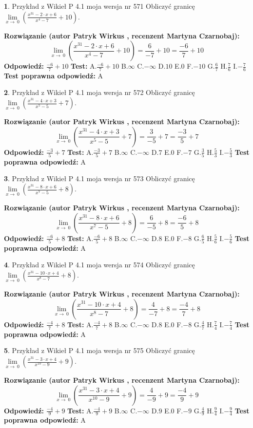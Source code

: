 \documentclass[12pt, a4paper]{article}
\theoremstyle{definition} %
\newtheorem{zad}{}
\newcommand{\zadStart}[1]{\begin{zad}#1\newline}
\newcommand{\zadStop}{\end{zad}}
\newcommand{\rozwStart}[2]{\noindent \textbf{Rozwiązanie (autor #1 , recenzent #2): }\newline}
\newcommand{\rozwStop}{\newline}
\newcommand{\odpStart}{\noindent \textbf{Odpowiedź:}\newline}
\newcommand{\odpStop}{\newline}
\newcommand{\testStart}{\noindent \textbf{Test:}\newline}
\newcommand{\testStop}{\newline}
\newcommand{\kluczStart}{\noindent \textbf{Test poprawna odpowiedź:}\newline}
\newcommand{\kluczStop}{\newline}
\begin{document}
\zadStart{Przykład z Wikieł P 4.1 moja wersja nr 571}
Obliczyć granicę $\lim\limits_{x\to\ 0}(\frac{x^{31}-2 \cdot x +6}{x^{4}-7}+10)$.
\zadStop
\rozwStart{Patryk Wirkus}{Martyna Czarnobaj}
$$\lim\limits_{x\to\ 0}(\frac{x^{31}-2 \cdot x +6}{x^{4}-7}+10)=\frac{6}{-7}+10=\frac{-6}{7}+10$$
\rozwStop
\odpStart
$\frac{-6}{7}+10$
\odpStop
\testStart
A.$\frac{-6}{7}+10$
B.$\infty$
C.$-\infty$
D.$10$
E.$0$
F.$-10$
G.$\frac{6}{7}$
H.$\frac{7}{6}$
I.$-\frac{7}{6}$
\testStop
\kluczStart
A
\kluczStop



\zadStart{Przykład z Wikieł P 4.1 moja wersja nr 572}
Obliczyć granicę $\lim\limits_{x\to\ 0}(\frac{x^{31}-4 \cdot x +3}{x^{5}-5}+7)$.
\zadStop
\rozwStart{Patryk Wirkus}{Martyna Czarnobaj}
$$\lim\limits_{x\to\ 0}(\frac{x^{31}-4 \cdot x +3}{x^{5}-5}+7)=\frac{3}{-5}+7=\frac{-3}{5}+7$$
\rozwStop
\odpStart
$\frac{-3}{5}+7$
\odpStop
\testStart
A.$\frac{-3}{5}+7$
B.$\infty$
C.$-\infty$
D.$7$
E.$0$
F.$-7$
G.$\frac{3}{5}$
H.$\frac{5}{3}$
I.$-\frac{5}{3}$
\testStop
\kluczStart
A
\kluczStop



\zadStart{Przykład z Wikieł P 4.1 moja wersja nr 573}
Obliczyć granicę $\lim\limits_{x\to\ 0}(\frac{x^{31}-8 \cdot x +6}{x^{7}-5}+8)$.
\zadStop
\rozwStart{Patryk Wirkus}{Martyna Czarnobaj}
$$\lim\limits_{x\to\ 0}(\frac{x^{31}-8 \cdot x +6}{x^{7}-5}+8)=\frac{6}{-5}+8=\frac{-6}{5}+8$$
\rozwStop
\odpStart
$\frac{-6}{5}+8$
\odpStop
\testStart
A.$\frac{-6}{5}+8$
B.$\infty$
C.$-\infty$
D.$8$
E.$0$
F.$-8$
G.$\frac{6}{5}$
H.$\frac{5}{6}$
I.$-\frac{5}{6}$
\testStop
\kluczStart
A
\kluczStop



\zadStart{Przykład z Wikieł P 4.1 moja wersja nr 574}
Obliczyć granicę $\lim\limits_{x\to\ 0}(\frac{x^{31}-10 \cdot x +4}{x^{8}-7}+8)$.
\zadStop
\rozwStart{Patryk Wirkus}{Martyna Czarnobaj}
$$\lim\limits_{x\to\ 0}(\frac{x^{31}-10 \cdot x +4}{x^{8}-7}+8)=\frac{4}{-7}+8=\frac{-4}{7}+8$$
\rozwStop
\odpStart
$\frac{-4}{7}+8$
\odpStop
\testStart
A.$\frac{-4}{7}+8$
B.$\infty$
C.$-\infty$
D.$8$
E.$0$
F.$-8$
G.$\frac{4}{7}$
H.$\frac{7}{4}$
I.$-\frac{7}{4}$
\testStop
\kluczStart
A
\kluczStop



\zadStart{Przykład z Wikieł P 4.1 moja wersja nr 575}
Obliczyć granicę $\lim\limits_{x\to\ 0}(\frac{x^{31}-3 \cdot x +4}{x^{10}-9}+9)$.
\zadStop
\rozwStart{Patryk Wirkus}{Martyna Czarnobaj}
$$\lim\limits_{x\to\ 0}(\frac{x^{31}-3 \cdot x +4}{x^{10}-9}+9)=\frac{4}{-9}+9=\frac{-4}{9}+9$$
\rozwStop
\odpStart
$\frac{-4}{9}+9$
\odpStop
\testStart
A.$\frac{-4}{9}+9$
B.$\infty$
C.$-\infty$
D.$9$
E.$0$
F.$-9$
G.$\frac{4}{9}$
H.$\frac{9}{4}$
I.$-\frac{9}{4}$
\testStop
\kluczStart
A
\kluczStop
\end{document}
